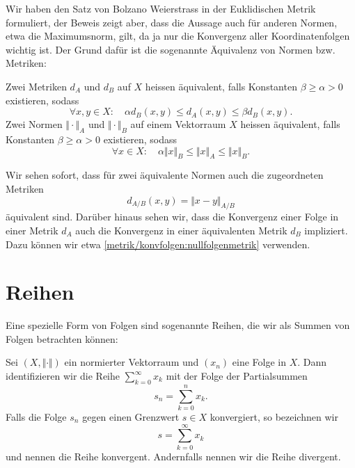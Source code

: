 Wir haben den Satz von Bolzano Weierstrass in der Euklidischen Metrik formuliert, der Beweis zeigt aber, dass die Aussage auch für anderen Normen, etwa die Maximumsnorm, gilt, da ja nur die Konvergenz aller Koordinatenfolgen wichtig ist. Der Grund dafür ist die sogenannte Äquivalenz von Normen bzw. Metriken:
\label{metrik/teilfolgen:definition-6}
\begin{definition}{}{}



Zwei Metriken \(d_A\) und \(d_B\) auf \(X\) heissen äquivalent, falls Konstanten \(\beta \geq \alpha > 0\) existieren, sodass
\begin{equation*}
\forall x,y \in X: \quad \alpha  d_B(x,y) \leq d_A(x,y) \leq \beta d_B(x,y) .
\end{equation*}
Zwei Normen \(\Vert \cdot \Vert_A\) und \(\Vert \cdot \Vert_B\) auf einem Vektorraum \(X\) heissen äquivalent, falls Konstanten \(\beta \geq \alpha > 0\) existieren, sodass
\begin{equation*}
\forall x  \in X: \quad \alpha  \Vert x \Vert_B  \leq \Vert x \Vert_A  \leq \Vert x \Vert_B  .
\end{equation*}\end{definition}

Wir sehen sofort, dass für zwei äquivalente Normen auch die zugeordneten Metriken
\begin{equation*}
 d_{A/B}(x,y) = \Vert x -y \Vert_{A/B}
\end{equation*}
äquivalent sind.
Darüber hinaus sehen wir, dass die Konvergenz einer Folge in einer Metrik \(d_A\) auch die Konvergenz in einer äquivalenten Metrik \(d_B\) impliziert. Dazu können wir etwa \cref{metrik/konvfolgen:nullfolgenmetrik} verwenden.


\section{Reihen}
\label{\detokenize{metrik/reihen:reihen}}\label{\detokenize{metrik/reihen::doc}}
Eine spezielle Form von Folgen sind sogenannte Reihen, die wir als Summen von Folgen betrachten können:
\label{metrik/reihen:definition-0}
\begin{definition}{}{}



Sei \((X,\Vert \cdot \Vert)\) ein normierter Vektorraum und \((x_n)\) eine Folge in \(X\). Dann identifizieren wir die Reihe \(\sum_{k=0}^\infty x_k\) mit der Folge der Partialsummen
\begin{equation*}
 s_n = \sum_{k=0}^n x_k.
\end{equation*}
Falls die Folge \(s_n\) gegen einen Grenzwert \(s \in  X\) konvergiert, so bezeichnen wir
\begin{equation*}
 s = \sum_{k=0}^\infty x_k
\end{equation*}
und nennen die Reihe konvergent. Andernfalls nennen wir die Reihe divergent.
\end{definition}

